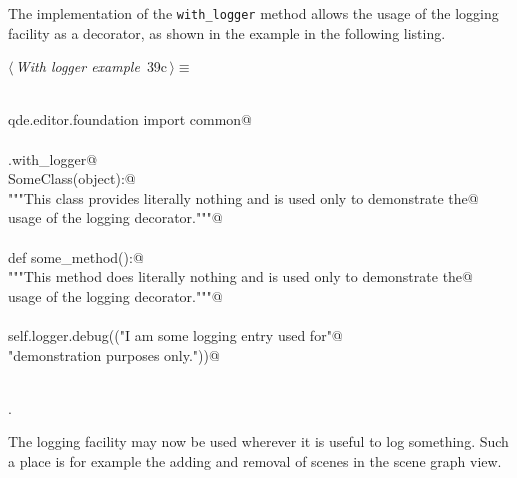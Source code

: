 \documentclass[
    a4paper,      %
    10pt,         %
    openright,    %
    notitlepage,  %
    parskip=half, %
]{scrreprt}       %
\theoremstyle{definition}                    %
\begin{document}
The implementation of the \verb+with_logger+ method allows the usage of the
logging facility as a decorator, as shown in the example in the following
listing.

\begin{flushleft} \small
\begin{minipage}{\linewidth}\label{scrap50}\raggedright\small
{} $\langle\,${\itshape With logger example}\nobreak\ {\footnotesize {39c}}$\,\rangle\equiv$
\vspace{-1ex}
\begin{list}{}{} \item
\mbox{}\lstinline@@\\
\mbox{}\lstinline@from qde.editor.foundation import common@\\
\mbox{}\lstinline@@\\
\mbox{}\lstinline@common.with_logger@\\
\mbox{}\lstinline@def SomeClass(object):@\\
\mbox{}\lstinline@    """This class provides literally nothing and is used only to demonstrate the@\\
\mbox{}\lstinline@    usage of the logging decorator."""@\\
\mbox{}\lstinline@@\\
\mbox{}\lstinline@    def some_method():@\\
\mbox{}\lstinline@        """This method does literally nothing and is used only to demonstrate the@\\
\mbox{}\lstinline@        usage of the logging decorator."""@\\
\mbox{}\lstinline@@\\
\mbox{}\lstinline@        self.logger.debug(("I am some logging entry used for"@\\
\mbox{}\lstinline@                           "demonstration purposes only."))@\\
\mbox{}\lstinline@@\\
\mbox{}\lstinline@@{\NWsep}
\end{list}
\vspace{-1.5ex}
\footnotesize
\begin{list}{}{\setlength{\itemsep}{-\parsep}\setlength{\itemindent}{-\leftmargin}}
\item {\NWtxtMacroNoRef}.

\item{}
\end{list}
\end{minipage}\vspace{4ex}
\end{flushleft}
The logging facility may now be used wherever it is useful to log something.
Such a place is for example the adding and removal of scenes in the scene graph
view.
\end{document}
